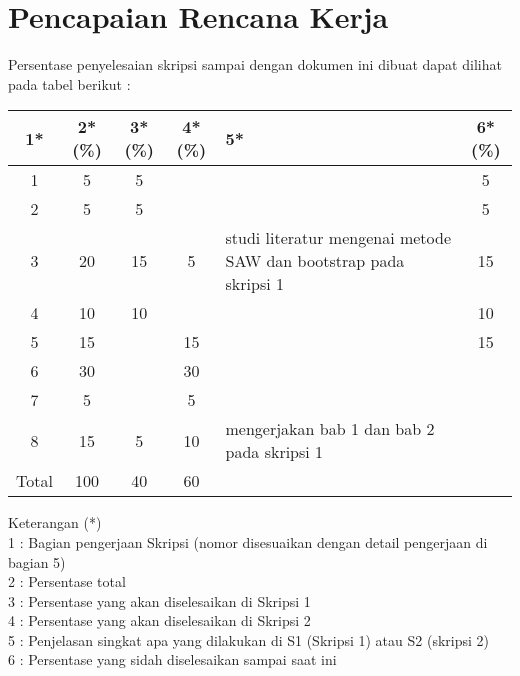 \documentclass[a4paper,twoside]{article}
\begin{document}
\section{Pencapaian Rencana Kerja}
Persentase penyelesaian skripsi sampai dengan dokumen ini dibuat dapat dilihat pada tabel berikut :

\begin{center}
  \begin{tabular}{ | c | c | c | c | l | c |}
    \hline
    1*  & 2*(\%) & 3*(\%) & 4*(\%) &5* &6*(\%)\\ \hline \hline
    1   & 5  & 5  &  &  & 5 \\ \hline
    2   & 5 & 5  &   & & 5\\ \hline
    3   & 20  & 15  &5  &  {\footnotesize studi literatur mengenai metode SAW dan bootstrap pada skripsi 1}&15 \\ \hline
    4   & 10  & 10  &   & &10 \\ \hline
    5   & 15  &   & 15 &  &15\\ \hline
		6		& 30  &   & 30 &  &\\ \hline
    7   & 5 &  & 5  & &\\ \hline
    8   & 15  & 5  & 10 & {\footnotesize mengerjakan bab 1 dan bab 2 pada skripsi 1} & \\ \hline
    Total  & 100  & 40  & 60 & &  \\ \hline
                          \end{tabular}
\end{center}

Keterangan (*)\\
1 : Bagian pengerjaan Skripsi (nomor disesuaikan dengan detail pengerjaan di bagian 5)\\
2 : Persentase total \\
3 : Persentase yang akan diselesaikan di Skripsi 1 \\
4 : Persentase yang akan diselesaikan di Skripsi 2 \\
5 : Penjelasan singkat apa yang dilakukan di S1 (Skripsi 1) atau S2 (skripsi 2)\\
6 : Persentase yang sidah diselesaikan sampai saat ini 

\end{document}
